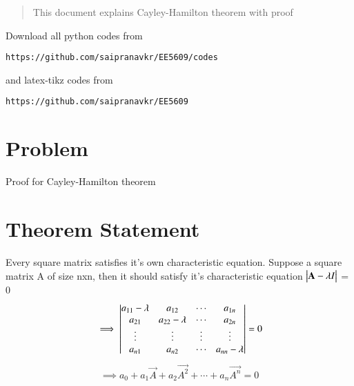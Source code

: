 \documentclass[journal,12pt,twocolumn]{IEEEtran}
\begin{document}
%
\begin{abstract}
This document explains Cayley-Hamilton theorem with proof
\end{abstract}
Download all python codes from 
%
\begin{lstlisting}
https://github.com/saipranavkr/EE5609/codes
\end{lstlisting}
%
and latex-tikz codes from 
%
\begin{lstlisting}
https://github.com/saipranavkr/EE5609
\end{lstlisting}
%
\renewcommand{\theenumi}{\roman{enumi}}%
\section{Problem}
Proof for Cayley-Hamilton theorem
%
%
\section{Theorem Statement}
Every square matrix satisfies it's own characteristic equation.
Suppose a square matrix A of size nxn, then it should satisfy it's characteristic equation $\begin{vmatrix}\mathbf{A}-\lambda I\end{vmatrix}$ = 0
\begin{align} 
    \implies \begin{vmatrix}a_{11}-\lambda & a_{12} & \cdots & a_{1n} \\
    a_{21} & a_{22}-\lambda & \cdots & a_{2n} \\ 
    \vdots & \vdots & \vdots & \vdots \\ 
    a_{n1} & a_{n2} & \cdots & a_{nn}-\lambda \end{vmatrix} = 0 \nonumber
\end{align}
\begin{align} \label{eq:statement}
    \implies a_0+a_1\vec{A}+a_2\vec{A^2}+\cdots+a_n\vec{A^n} = 0
\end{align}
\end{document}
